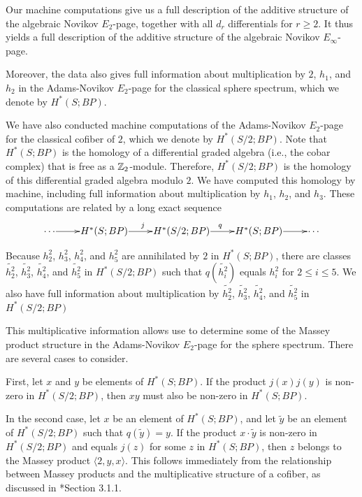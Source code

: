 Our machine computations give us a full description of the
additive structure of the algebraic Novikov $E_2$-page, together
with all $d_r$ differentials for $r \geq 2$.  
It thus yields a full description of the additive structure
of the algebraic Novikov $E_\infty$-page.

Moreover, the data also gives full information about
multiplication by $2$, $h_1$, and $h_2$ in the 
Adams-Novikov $E_2$-page for the classical sphere spectrum,
which we denote by $H^*(S; BP)$.

We have also conducted machine computations of the
Adams-Novikov $E_2$-page for the classical cofiber of $2$, which
we denote by $H^*(S/2; BP)$.
Note that $H^*(S; BP)$ is the homology of a differential
graded algebra (i.e., the cobar complex) that is free as a $\mathbb{Z}_2$-module.
Therefore, $H^*(S/2; BP)$ 
is the homology of this differential graded algebra modulo $2$.
We have computed this homology by machine, including full information
about multiplication by $h_1$, $h_2$, and $h_3$.
These computations are related by a long exact sequence 
\[
\xymatrix@1{
\cdots \ar[r] & H^*(S; BP) \ar[r]^j & H^*(S/2; BP) \ar[r]^q &
H^*(S; BP) \ar[r] & \cdots 
}
\]


Because $h_2^2$, $h_3^2$, $h_4^2$, and $h_5^2$ are annihilated by
$2$ in $H^*(S; BP)$, there are classes
$\widetilde{h_2^2}$, $\widetilde{h_3^2}$, $\widetilde{h_4^2}$, and 
$\widetilde{h_5^2}$ in $H^*(S/2; BP)$ such that
$q(\widetilde{h_i^2})$ equals $h_i^2$ for $2 \leq i \leq 5$.
We also have full information about multiplication by
$\widetilde{h_2^2}$, $\widetilde{h_3^2}$, $\widetilde{h_4^2}$, and 
$\widetilde{h_5^2}$ in $H^*(S/2; BP)$

This multiplicative information allows use to determine some of the
Massey product structure in the Adams-Novikov $E_2$-page for the
sphere spectrum.  There are several cases to consider.

First, let $x$ and $y$ be elements of $H^*(S;BP)$.
If the product $j(x) j(y)$ is non-zero in $H^*(S/2;BP)$, then 
$x y$ must also be non-zero in $H^*(S; BP)$.

In the second case, let $x$ be an element of $H^*(S; BP)$, and let
$\widetilde{y}$ be an element of $H^*(S/2; BP)$ such that
$q(\widetilde{y}) = y$.
If the product $x \cdot \widetilde{y}$ is non-zero in
$H^*(S/2; BP)$ and equals $j(z)$ for some $z$ in
$H^*(S; BP)$, then $z$ belongs to the Massey product
$\langle 2, y, x \rangle$.  This follows immediately from the
relationship between Massey products and the multiplicative
structure of a cofiber, as discussed in \cite{Isaksen14c}*{Section 3.1.1}.

